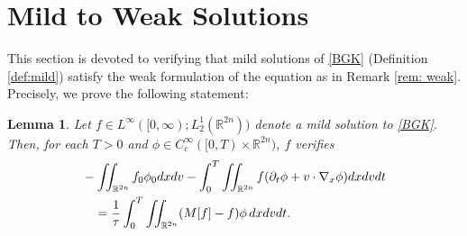 \documentclass{amsart}
\theoremstyle{plain}
\newtheorem{lemma}[theorem]{Lemma}
\theoremstyle{remark}
\numberwithin{equation}{section}
\newcommand{\p}{\partial}
\newcommand{\R}{\mathbb{R}}
\newcommand{\dx}{\textnormal{d}x}
\newcommand{\dv}{\textnormal{d}v}
\newcommand{\dt}{\textnormal{d}t}
\begin{document}
\section{Mild to Weak Solutions} \label{app: uniqueness}
This section is devoted to verifying that mild solutions of \eqref{BGK} (Definition \ref{def:mild}) satisfy the weak formulation of the equation as in  Remark \ref{rem: weak}. Precisely, we prove the following statement:

\begin{lemma}
    Let $f \in L^\infty([0,\infty);L^1_2(\R^{2n}))$ denote a mild solution to \eqref{BGK}. Then, for each $T>0$ and $\phi\in C_c^\infty([0,T)\times\R^{2n})$, $f$ verifies
    \begin{align*}
        &-\iint_{\R^{2n}} f_0 \phi_0 \dx\dv - \int_0^T \iint_{\R^{2n}} f(\p_t\phi + v\cdot \nabla_x\phi)\dx\dv\dt\\
        &\quad = \frac{1}{\tau}\int_0^T \iint_{\R^{2n}}(M[f]-f)\phi\, \dx \dv \dt.
    \end{align*}
\end{lemma}
\end{document}
